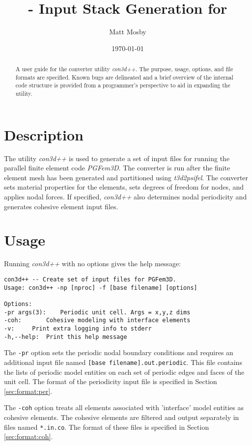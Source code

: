 \documentclass[]{article}
\title{\con{} - Input Stack Generation for \pgf{}}
\author{Matt Mosby}
\date{\today}
\def\pgf{\emph{PGFem3D}}
\def\con{\emph{con3d++}}
\begin{document}
\maketitle
\begin{abstract}
  A user guide for the converter utility \con. The purpose, usage,
  options, and file formats are specified. Known bugs are delineated
  and a brief overview of the internal code structure is provided from
  a programmer's perspective to aid in expanding the utility.
\end{abstract}
\section{Description}
The utility \con{} is used to generate a set of input files for
running the parallel finite element code \pgf. The converter is run
after the finite element mesh has been generated and partitioned using
\emph{t3d2psifel}. The converter sets material properties for the
elements, sets degrees of freedom for nodes, and applies nodal
forces. If specified, \con{} also determines nodal periodicity and
generates cohesive element input files.

\section{Usage}
Running \con{} with no options gives the help message:
\begin{center}
\begin{minipage}{0.8\textwidth}
\begin{lstlisting}
con3d++ -- Create set of input files for PGFem3D.
Usage: con3d++ -np [nproc] -f [base filename] [options]

Options:
-pr args(3):	Periodic unit cell. Args = x,y,z dims
-coh:		Cohesive modeling with interface elements
-v:		Print extra logging info to stderr
-h,--help:	Print this help message
\end{lstlisting}
\end{minipage}
\end{center}

The \verb=-pr= option sets the periodic nodal boundary conditions and
requires an additional input file named
\verb=[base filename].out.periodic=. This file contains the lists of
periodic model entities on each set of periodic edges and faces of the
unit cell. The format of the periodicity input file is specified in
Section \ref{sec:format:per}.

The \verb=-coh= option treats all elements associated with 'interface'
model entities as cohesive elements. The cohesive elements are
filtered and output separately in files named \verb=*.in.co=. The
format of these files is specified in Section \ref{sec:format:coh}.
\end{document}
